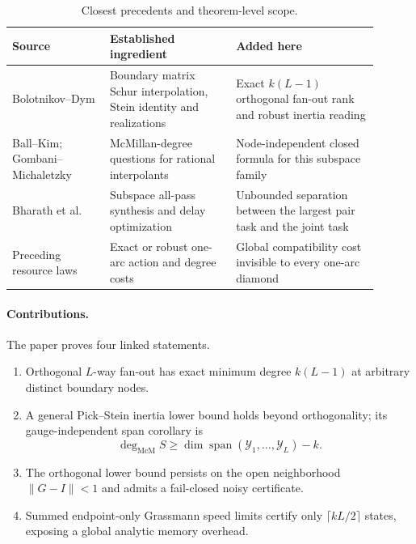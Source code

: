 \documentclass[11pt]{article}
\theoremstyle{definition}
\theoremstyle{remark}
\newcommand{\Span}{\operatorname{span}}
\newcommand{\mcdeg}{\deg_{\mathrm{McM}}}
\newcommand{\norm}[1]{\lVert#1\rVert}
\begin{document}
\begin{table}[t]
\centering
\small
\begin{tabular}{@{}>{\raggedright\arraybackslash}p{0.24\linewidth}
>{\raggedright\arraybackslash}p{0.31\linewidth}
>{\raggedright\arraybackslash}p{0.35\linewidth}@{}}
\toprule
Source & Established ingredient & Added here \\
\midrule
Bolotnikov--Dym \cite{BolotnikovDym2006}
& Boundary matrix Schur interpolation, Stein identity and realizations
& Exact $k(L-1)$ orthogonal fan-out rank and robust inertia reading \\
Ball--Kim; Gombani--Michaletzky \cite{BallKim1994,GombaniMichaletzky2007}
& McMillan-degree questions for rational interpolants
& Node-independent closed formula for this subspace family \\
Bharath et al.\ \cite{BharathEtAl2023}
& Subspace all-pass synthesis and delay optimization
& Unbounded separation between the largest pair task and the joint task \\
Preceding resource laws \cite{ErikssonRouting2026,ErikssonDelayRegions2026,
ErikssonActionMemory2026}
& Exact or robust one-arc action and degree costs
& Global compatibility cost invisible to every one-arc diamond \\
\bottomrule
\end{tabular}
\caption{Closest precedents and theorem-level scope.}
\label{tab:precedent}
\end{table}

\paragraph{Contributions.}
The paper proves four linked statements.
\begin{enumerate}
 \item Orthogonal $L$-way fan-out has exact minimum degree $k(L-1)$ at
 arbitrary distinct boundary nodes.
 \item A general Pick--Stein inertia lower bound holds beyond orthogonality;
 its gauge-independent span corollary is
 \[
   \mcdeg S\ge\dim\Span(\mathcal Y_1,\ldots,\mathcal Y_L)-k.
 \]
 \item The orthogonal lower bound persists on the open neighborhood
$\norm{G-I}<1$ and admits a fail-closed noisy certificate.
 \item Summed endpoint-only Grassmann speed limits certify only
$\lceil kL/2\rceil$ states, exposing a global analytic memory overhead.
\end{enumerate}
\end{document}

